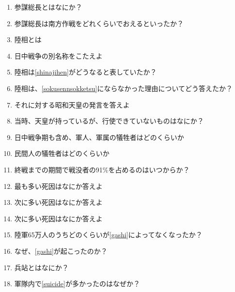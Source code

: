 \documentclass[]{jsarticle}
\begin{document}
\begin{enumerate}
	\item 参謀総長とはなにか？
	\item 参謀総長は南方作戦をどれくらいでおえるといったか？
	\item 陸相とは
	\item 日中戦争の別名称をこたえよ\label{shinajihen}
	\item 陸相は\ref{shinajihen}がどうなると表していたか？\label{sokusennsokketsu}
	\item 陸相は、\ref{sokusennsokketsu}にならなかった理由についてどう答えたか？
	\item それに対する昭和天皇の発言を答えよ
	\item 当時、天皇が持っているが、行使できていないものはなにか？
	\item 日中戦争期も含め、軍人、軍属の犠牲者はどのくらいか
	\item 民間人の犠牲者はどのくらいか
	\item 終戦までの期間で戦没者の91\%を占めるのはいつからか？
	\item 最も多い死因はなにか答えよ\label{gashi}
	\item 次に多い死因はなにか答えよ\label{disease}
	\item 次に多い死因はなにか答えよ\label{suicide}
	\item 陸軍65万人のうちどのくらいが\ref{gashi}によってなくなったか？
	\item なぜ、\ref{gashi}が起こったのか？
	\item 兵站とはなにか？
	\item 軍隊内で\ref{suicide}が多かったのはなぜか？
\end{enumerate}

\begin{comment}
	\begin{figure}[htbp]
		\begin{center}
			\texttt{[image: ./src/RC\_series\_circuit\_c.png]}
			\caption{RC直列回路 ($V_C$の測定)}
			\label{fig:RC_series_circuit_c}
		\end{center}
	\end{figure}
	\begin{equation}
		\label{Relationship_between_impedance_Z}
		V = ZI [\si{\volt}], I = \frac{V}{Z} [\si{\ampere}], Z = \frac{V}{I}[\si{\ohm}]
	\end{equation}
	\begin{table}[h]
		\caption{計測および実験補助器具}
		\label{tab:fixtures}
		\centering
		\begin{tabular}{|c|c|c|c|}
			\hline
			器具名 & 製造元 & 計器番号 & 定格 \\
		\end{tabular}
	\end{table}
\end{comment}
\end{document}
